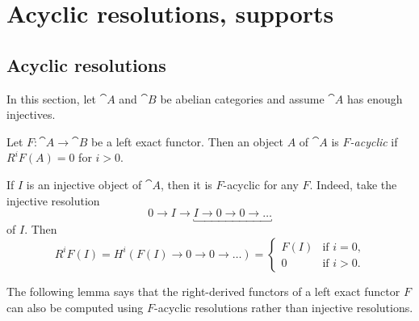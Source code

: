 \chapter{Acyclic resolutions, supports}

\section{Acyclic resolutions}
\noindent
In this section, let \(\cat A\) and \(\cat B\) be abelian categories and assume \(\cat A\) has enough injectives.

\begin{defn}
Let \(F\colon\cat A\to\cat B\) be a left exact functor.
Then an object \(A\) of \(\cat A\) is \emph{\(F\)-acyclic} if \(R^iF(A)=0\) for \(i>0\).
\end{defn}

\begin{exmp}
If \(I\) is an injective object of \(\cat A\), then it is \(F\)-acyclic for any \(F\).
Indeed, take the injective resolution
\[ 0 \to I \to \underbracket{I \to 0 \to 0 \to \ldots} \]
of \(I\).
Then
\[ R^iF(I) = H^i(F(I)\to 0\to 0\to\ldots) =
  \begin{cases}
    F(I) & \text{if } i=0\text{,} \\
    0 & \text{if } i>0\text{.}
  \end{cases}
\]
\end{exmp}

The following lemma says that the right-derived functors of a left exact functor \(F\) can also be computed using \(F\)-acyclic resolutions rather than injective resolutions.

